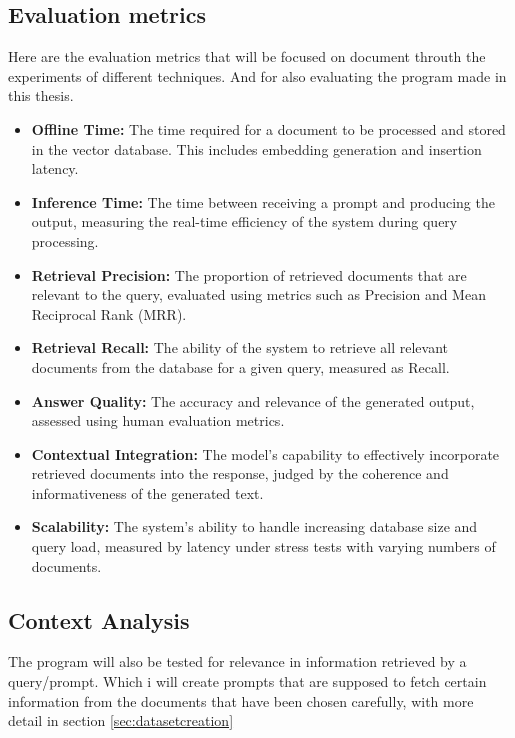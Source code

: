 \subsection{Evaluation metrics}
Here are the evaluation metrics that will be focused on document throuth the experiments of different techniques. And for also evaluating the program made in this thesis.
\begin{samepage}
\begin{itemize} 
\item \textbf{Offline Time:} The time required for a document to be processed and stored in the vector database. This includes embedding generation and insertion latency. 
\item \textbf{Inference Time:} The time between receiving a prompt and producing the output, measuring the real-time efficiency of the system during query processing. 
\item \textbf{Retrieval Precision:} The proportion of retrieved documents that are relevant to the query, evaluated using metrics such as Precision and Mean Reciprocal Rank (MRR). 
\item \textbf{Retrieval Recall:} The ability of the system to retrieve all relevant documents from the database for a given query, measured as Recall. \item \textbf{Answer Quality:} The accuracy and relevance of the generated output, assessed using human evaluation metrics. 
\item \textbf{Contextual Integration:} The model’s capability to effectively incorporate retrieved documents into the response, judged by the coherence and informativeness of the generated text. 
\item \textbf{Scalability:} The system’s ability to handle increasing database size and query load, measured by latency under stress tests with varying numbers of documents. 
\end{itemize}
\end{samepage}
\subsection{Context Analysis}
The program will also be tested for relevance in information retrieved by a query/prompt. Which i will create prompts that are supposed to fetch certain information from the documents that have been chosen carefully, with more detail in section \ref{sec:datasetcreation}
